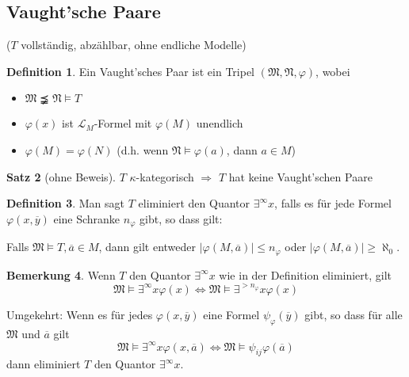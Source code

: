 \documentclass[12pt,parskip=full]{scrartcl}
\newcommand{\abs}[1]{{\left| #1 \right|}}
\theoremstyle{definition}
\newtheorem{theorem}{Satz}[section]
\newtheorem{definition}[theorem]{Definition}
\newtheorem{remark}[theorem]{Bemerkung}
\begin{document}
 	\subsection{Vaught'sche Paare}
 	
 	($T$ vollständig, abzählbar, ohne endliche Modelle)
 	
 	\begin{definition}
 		Ein Vaught'sches Paar ist ein Tripel $(\mathfrak{M}, \mathfrak{N}, \varphi)$, wobei
 		\begin{itemize}
 			\item $\mathfrak{M} \precneqq \mathfrak{N} \models T$
 			\item $\varphi(x)$ ist $\mathcal{L}_M$-Formel mit $\varphi(M)$ unendlich
 			\item $\varphi(M) = \varphi(N)$ (d.h. wenn $\mathfrak{N} \models \varphi(a)$, dann $a \in M$)
 		\end{itemize}
 	\end{definition}
 
 	\begin{theorem}[ohne Beweis]
 		$T$ $\kappa$-kategorisch $\Rightarrow$ $T$ hat keine Vaught'schen Paare
 	\end{theorem}
 
 	\begin{definition}
 		Man sagt $T$ eliminiert den Quantor $\exists^\infty x$, falls es für jede Formel $\varphi(x, \overline{y})$ eine Schranke $n_\varphi$ gibt, so dass gilt:
 		
 		Falls $\mathfrak{M} \models T, \overline{a} \in M$, dann gilt entweder $\abs{\varphi(M, \overline{a})} \leq n_\varphi$ oder $\abs{\varphi(M, \overline{a})} \geq \aleph_0$.
 	\end{definition}
 
 	\begin{remark}
 		Wenn $T$ den Quantor $\exists^\infty x$ wie in der Definition eliminiert, gilt
 		\begin{equation*}
	 		\mathfrak{M} \models \exists^\infty x \varphi(x) \Leftrightarrow \mathfrak{M} \models \exists^{>n_\varphi} x \varphi(x)
 		\end{equation*}
 		
 		Umgekehrt: Wenn es für jedes $\varphi(x, \overline{y})$ eine Formel $\psi_\varphi(\overline{y})$ gibt, so dass für alle $\mathfrak{M}$ und $\overline{a}$ gilt
 		\begin{equation*}
	 		\mathfrak{M} \models \exists^\infty x \varphi(x, \overline{a}) \Leftrightarrow \mathfrak{M} \models \psi_{ij} \varphi(\overline{a})
 		\end{equation*}
 		dann eliminiert $T$ den Quantor $\exists^\infty x$.
 	\end{remark}
 
\end{document}

